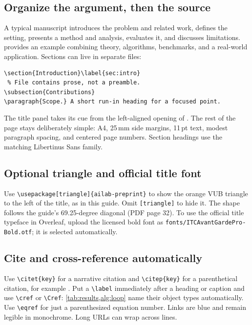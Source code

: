 \documentclass[11pt]{article}
\begin{document}
\subsection{Organize the argument, then the source}
A typical manuscript introduces the problem and related work, defines the setting,
presents a method and analysis, evaluates it, and discusses limitations.
\citet{saerensPreprint} provides an example combining theory, algorithms,
benchmarks, and a real-world application. Sections can live in separate files:
\begin{lstlisting}
\section{Introduction}\label{sec:intro}
 % File contains prose, not a preamble.
\subsection{Contributions}
\paragraph{Scope.} A short run-in heading for a focused point.
\end{lstlisting}
The title panel takes its cue from the left-aligned opening of
\citet{bessa2026emeans}. The rest of the page stays deliberately simple:
A4, 25\,mm side margins, 11\,pt text, modest paragraph spacing, and centered
page numbers. Section headings use the matching Libertinus Sans family.

\subsection{Optional triangle and official title font}
Use \verb|\usepackage[triangle]{ailab-preprint}| to show the orange VUB triangle
to the left of the title, as in this guide. Omit \texttt{[triangle]} to hide it.
The shape follows the guide's 69.25-degree diagonal (PDF page 32).
To use the official title typeface in Overleaf, upload the licensed bold font as
\texttt{fonts/ITCAvantGardePro-Bold.otf}; it is selected automatically.

\subsection{Cite and cross-reference automatically}
Use \verb|\citet{key}| for a narrative citation and \verb|\citep{key}| for a
parenthetical citation, for example \citep{bessa2026emeans}. Put a
\verb|\label| immediately after a heading or caption and use \verb|\cref| or
\verb|\Cref|: \cref{tab:results,alg:loop} name their object types automatically.
Use \verb|\eqref| for just a parenthesized equation number. Links are blue and
remain legible in monochrome. Long URLs can wrap across lines.
\end{document}
